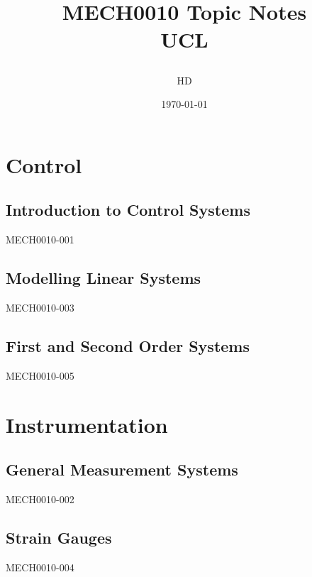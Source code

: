 \documentclass[12pt,a4paper, twoside]{report}
\begin{document}
\title{
  {MECH0010 Topic Notes}\\
  {\large UCL}
  \author{HD}
  \date{\today}
}
\maketitle
\tableofcontents
\part{Control}
\chapter{Introduction to Control Systems}
{MECH0010-001}
\chapter{Modelling Linear Systems}
{MECH0010-003}
\chapter{First and Second Order Systems}
{MECH0010-005}
\part{Instrumentation}
\chapter{General Measurement Systems}
{MECH0010-002}
\chapter{Strain Gauges}
{MECH0010-004}
\end{document}
